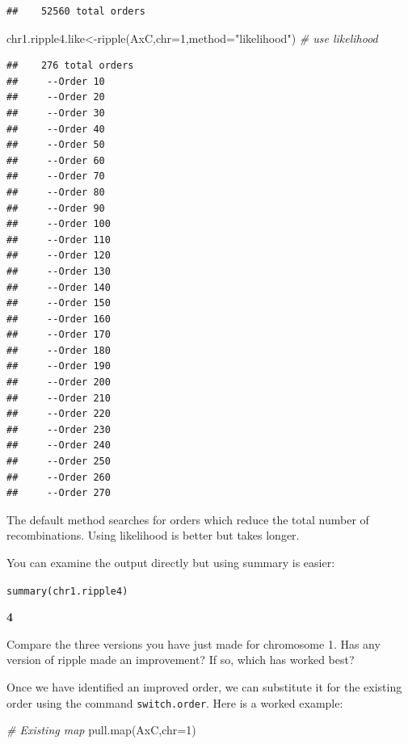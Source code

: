 \documentclass[
]{book}
\makeatletter
\newenvironment{Shaded}{\begin{snugshade}}{\end{snugshade}}
\newcommand{\AttributeTok}[1]{\textcolor[rgb]{0.77,0.63,0.00}{#1}}
\newcommand{\CommentTok}[1]{\textcolor[rgb]{0.56,0.35,0.01}{\textit{#1}}}
\newcommand{\DecValTok}[1]{\textcolor[rgb]{0.00,0.00,0.81}{#1}}
\newcommand{\FunctionTok}[1]{\textcolor[rgb]{0.00,0.00,0.00}{#1}}
\newcommand{\NormalTok}[1]{#1}
\newcommand{\OtherTok}[1]{\textcolor[rgb]{0.56,0.35,0.01}{#1}}
\newcommand{\StringTok}[1]{\textcolor[rgb]{0.31,0.60,0.02}{#1}}
\newenvironment{kframe}{%
\medskip{}
\setlength{\fboxsep}{.8em}
 \def\at@end@of@kframe{}%
 \ifinner\ifhmode%
  \def\at@end@of@kframe{\end{minipage}}%
  \begin{minipage}{\columnwidth}%
 \fi\fi%
 \def\FrameCommand##1{\hskip\@totalleftmargin \hskip-\fboxsep
 \colorbox{shadecolor}{##1}\hskip-\fboxsep
     \hskip-\linewidth \hskip-\@totalleftmargin \hskip\columnwidth}%
 \MakeFramed {\advance\hsize-\width
   \@totalleftmargin\z@ \linewidth\hsize
   \@setminipage}}%
 {\par\unskip\endMakeFramed%
 \at@end@of@kframe}
\newenvironment{rmdblock}[1]
  {
  \begin{itemize}
  \renewcommand{\labelitemi}{
    \raisebox{-.7\height}[0pt][0pt]{
      {\setkeys{Gin}{width=3em,keepaspectratio}\texttt{[image: images/\#1]}}
    }
  }
  \setlength{\fboxsep}{1em}
  \begin{kframe}
  \item
  }
  {
  \end{kframe}
  \end{itemize}
  }
\newenvironment{rmdquiz}
  {\begin{rmdblock}{quiz}}
  {\end{rmdblock}}
\makeatother
\begin{document}
\begin{verbatim}
##    52560 total orders
\end{verbatim}

\begin{Shaded}
\begin{Highlighting}[]
\NormalTok{chr1.ripple4.like}\OtherTok{\textless{}{-}}\FunctionTok{ripple}\NormalTok{(AxC,}\AttributeTok{chr=}\DecValTok{1}\NormalTok{,}\AttributeTok{method=}\StringTok{"likelihood"}\NormalTok{) }\CommentTok{\# use likelihood}
\end{Highlighting}
\end{Shaded}

\begin{verbatim}
##    276 total orders
##     --Order 10 
##     --Order 20 
##     --Order 30 
##     --Order 40 
##     --Order 50 
##     --Order 60 
##     --Order 70 
##     --Order 80 
##     --Order 90 
##     --Order 100 
##     --Order 110 
##     --Order 120 
##     --Order 130 
##     --Order 140 
##     --Order 150 
##     --Order 160 
##     --Order 170 
##     --Order 180 
##     --Order 190 
##     --Order 200 
##     --Order 210 
##     --Order 220 
##     --Order 230 
##     --Order 240 
##     --Order 250 
##     --Order 260 
##     --Order 270
\end{verbatim}

The default method searches for orders which reduce the total number of recombinations. Using likelihood is better but takes longer.

You can examine the output directly but using summary is easier:

\texttt{summary(chr1.ripple4)}

\begin{rmdquiz}
\textbf{4}

Compare the three versions you have just made for chromosome 1. Has any version of ripple made an improvement? If so, which has worked best?
\end{rmdquiz}

Once we have identified an improved order, we can substitute it for the existing order using the command \texttt{switch.order}. Here is a worked example:

\begin{Shaded}
\begin{Highlighting}[]
\CommentTok{\#  Existing map }
\FunctionTok{pull.map}\NormalTok{(AxC,}\AttributeTok{chr=}\DecValTok{1}\NormalTok{)}
\end{Highlighting}
\end{Shaded}
\end{document}
